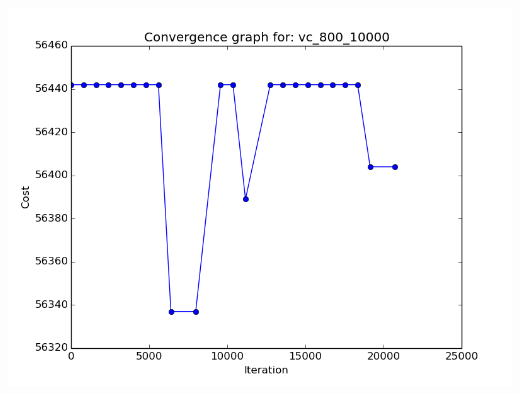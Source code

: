 \documentclass[11pt]{article}
\begin{document}
\begin{center}
\begin{minipage}{0.49\linewidth}
\end{minipage}
\begin{minipage}{0.49\linewidth}
\includegraphics[width=\linewidth]{cg_4.png}
\end{minipage}
\end{center}


\pagebreak
\end{document}
